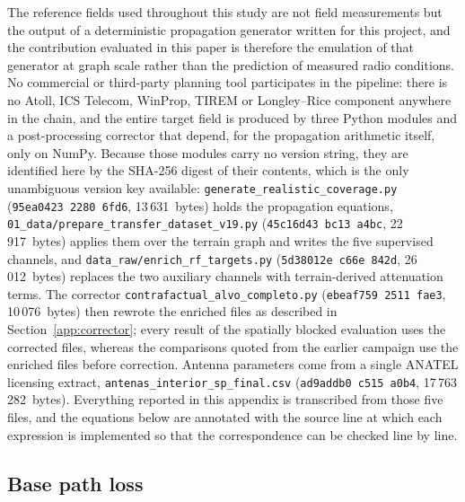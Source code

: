 The reference fields used throughout this study are not field measurements
but the output of a deterministic propagation generator written for this
project, and the contribution evaluated in this paper is
therefore the emulation of that generator at graph scale rather than the
prediction of measured radio conditions. No commercial or third-party
planning tool participates in the pipeline: there is no Atoll, ICS Telecom,
WinProp, TIREM or Longley--Rice component anywhere in the chain, and the
entire target field is produced by three Python modules and a post-processing corrector that depend, for
the propagation arithmetic itself, only on NumPy. Because those modules
carry no version string, they are identified here by the SHA-256 digest of
their contents, which is the only unambiguous version key available:
\texttt{generate\_\allowbreak{}realistic\_\allowbreak{}coverage\allowbreak{}.py} (\texttt{95ea0423\,2280\,6fd6},
13\,631~bytes) holds the propagation equations,
\texttt{01\_\allowbreak{}data/\allowbreak{}prepare\_\allowbreak{}transfer\_\allowbreak{}dataset\_\allowbreak{}v19.py}
(\texttt{45c16d43\,bc13\,a4bc}, 22\,917~bytes) applies them over the terrain
graph and writes the five supervised channels, and
\texttt{data\_\allowbreak{}raw/\allowbreak{}enrich\_\allowbreak{}rf\_\allowbreak{}targets\allowbreak{}.py} (\texttt{5d38012e\,c66e\,842d},
26\,012~bytes) replaces the two auxiliary channels with terrain-derived
attenuation terms. The corrector \texttt{contrafactual\_\allowbreak{}alvo\_\allowbreak{}completo\allowbreak{}.py}
(\texttt{ebeaf759\,2511\,fae3}, 10\,076~bytes) then rewrote the enriched files as
described in Section~\ref{app:corrector}; every result of the spatially blocked
evaluation uses the corrected files, whereas the comparisons quoted from the
earlier campaign use the enriched files before correction. Antenna
parameters come from a single ANATEL licensing extract,
\texttt{antenas\_\allowbreak{}interior\_\allowbreak{}sp\_\allowbreak{}final\allowbreak{}.csv}
(\texttt{ad9addb0\,c515\,a0b4}, 17\,763\,282~bytes). Everything reported in
this appendix is transcribed from those five files, and the equations below
are annotated with the source line at which each expression is implemented
so that the correspondence can be checked line by line.

\subsection{Base path loss}


